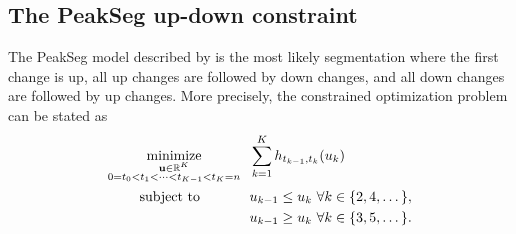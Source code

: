\documentclass{article}
\DeclareMathOperator*{\minimize}{minimize}
\newcommand{\RR}{\mathbb R}
\begin{document}
\subsection{The PeakSeg up-down constraint}
\label{sec:PeakSeg}

The PeakSeg model described by \citet{HOCKING-PeakSeg} is the most
likely segmentation where the first change is up, all up changes are
followed by down changes, and all down changes are followed by up
changes. More precisely, the constrained optimization problem can be
stated as
\begin{align}
  \label{eq:PeakSeg}
  \minimize_{
        \substack{\mathbf u\in\RR^K \\
    0=t_0<t_1<\cdots<t_{K-1}<t_K=n
}
    } &\ \ 
  \sum_{k=1}^K h_{t_{k-1}, t_k}(u_k)\\
      \text{subject to \hskip 0.9cm} &\ \ u_{k-1} \leq u_k\ \forall k\in\{2,4,\dots\},
  \nonumber\\
  &\ \ u_{k-1} \geq u_k\ \forall k\in\{3,5,\dots\}.
  \nonumber
\nonumber
\end{align}
\end{document}
